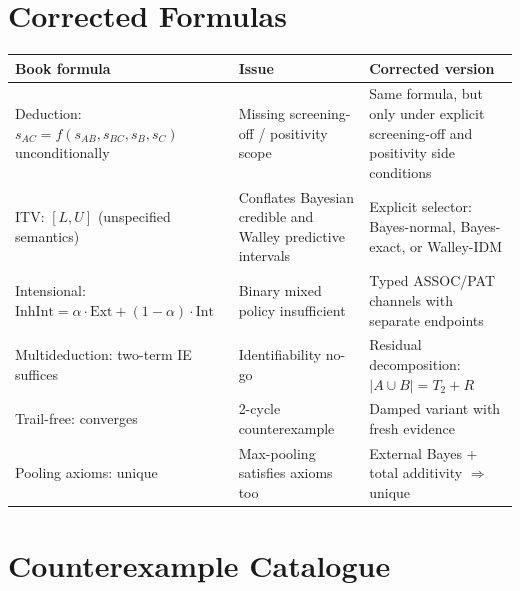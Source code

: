 \documentclass[11pt,openany]{report}
\begin{document}
\chapter{Corrected Formulas}
\label{app:corrected}

\begin{longtable}{p{}p{}p{}}
\textbf{Book formula} & \textbf{Issue} & \textbf{Corrected version} \\
\hline
Deduction: $s_{AC} = f(s_{AB}, s_{BC}, s_B, s_C)$ unconditionally &
Missing screening-off / positivity scope &
Same formula, but only under explicit screening-off and positivity side conditions \\
\hline
ITV: $[L, U]$ (unspecified semantics) &
Conflates Bayesian credible and Walley predictive intervals &
Explicit selector: Bayes-normal, Bayes-exact, or Walley-IDM \\
\hline
Intensional: $\text{InhInt} = \alpha \cdot \text{Ext} + (1-\alpha) \cdot \text{Int}$ &
Binary mixed policy insufficient &
Typed ASSOC/PAT channels with separate endpoints \\
\hline
Multideduction: two-term IE suffices &
Identifiability no-go &
Residual decomposition: $|A \cup B| = T_2 + R$ \\
\hline
Trail-free: converges &
2-cycle counterexample &
Damped variant with fresh evidence \\
\hline
Pooling axioms: unique &
Max-pooling satisfies axioms too &
External Bayes + total additivity $\Rightarrow$ unique \\
\hline
\end{longtable}


\chapter{Counterexample Catalogue}
\label{app:counterexamples}
\end{document}
